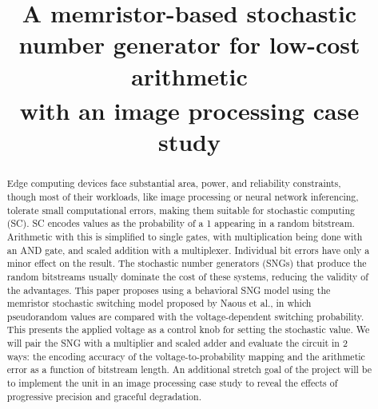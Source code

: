 \documentclass[conference]{IEEEtran}
\begin{document}
\title{A memristor-based stochastic number generator for low-cost arithmetic \\
{\footnotesize \textsuperscript{}with an image processing case study}
}

\author{
\and
{}
\and
{}
}

\maketitle

\begin{abstract}
    Edge computing devices face substantial area, power, and reliability constraints,
    though most of their workloads, like image processing or neural network inferencing,
    tolerate small computational errors, making them suitable for stochastic
    computing (SC). SC encodes values as the probability of a 1 appearing in a random
    bitstream. Arithmetic with this is simplified to single gates, with multiplication
    being done with an AND gate, and scaled addition with a
    multiplexer. Individual bit errors have only a minor effect on the result.
    The stochastic number generators (SNGs) that produce the random bitstreams usually
    dominate the cost of these systems, reducing the validity of the advantages. 
    This paper proposes using a behavioral SNG model using the memristor stochastic
    switching model proposed by Naous et al., in which
    pseudorandom values are compared with the voltage-dependent switching probability.
    This presents the applied voltage as a control knob for setting the stochastic value.
    We will pair the SNG with a multiplier and scaled adder and evaluate the circuit
    in 2 ways: the encoding accuracy of the voltage-to-probability mapping and
    the arithmetic error as a function of bitstream length.
    An additional stretch goal of the project will be to implement the unit in
    an image processing case study to reveal the effects of progressive precision
    and graceful degradation.

\end{abstract}
\end{document}
